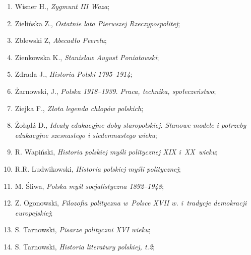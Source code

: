 \documentclass[a4paper,11pt]{article}
\begin{document}
\begin{enumerate}
\item Wisner H., \textit{Zygmunt III Waza};



\item Zielińska Z., \textit{Ostatnie lata Pierwszej Rzeczypospolitej};



\item Zblewski Z, \textit{Abecadło Peerelu};



\item Zienkowska K., \textit{Stanisław August Poniatowski};



\item Zdrada J., \textit{Historia Polski 1795--1914};



\item Żarnowski, J., \textit{Polska 1918--1939. Praca, technika,
    społeczeństwo};



\item Ziejka F., \textit{Złota legenda chłopów polskich};



\item Żołądź D., \textit{Ideały edukacyjne doby staropolskiej. Stanowe
    modele i potrzeby edukacyjne szesnastego i siedemnastego wieku};



\item R. Wapiński, \textit{Historia polskiej myśli politycznej XIX
    i~XX~wieku};



\item R.R. Ludwikowski, \textit{Historia polskiej myśli politycznej};



\item M. Śliwa, \textit{Polska myśl socjalistyczna 1892--1948};



\item Z. Ogonowski, \textit{Filozofia polityczna w~Polsce XVII w.
    i~tradycje demokracji europejskiej};



\item S. Tarnowski, \textit{Pisarze polityczni XVI wieku};



\item S. Tarnowski, \textit{Historia literatury polskiej, t.2};




\end{enumerate}
\end{document}
